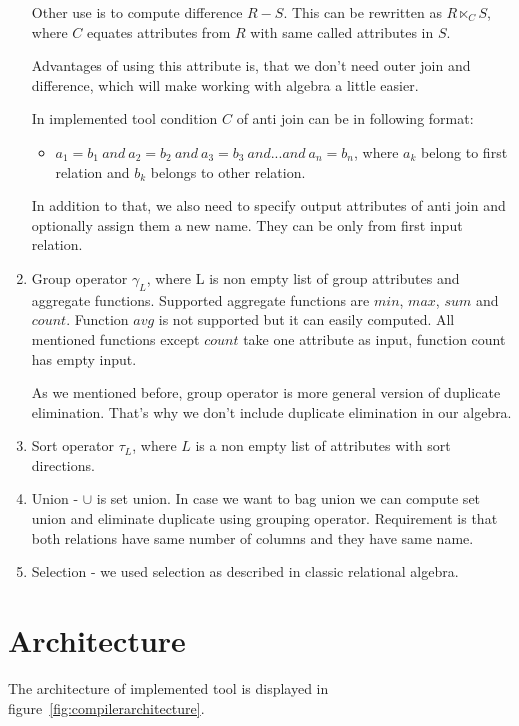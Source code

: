 \begin{enumerate}
Other use is to compute difference $R-S$. This can be rewritten as $R \ltimes_C S$, where $C$ equates attributes from $R$ with same called attributes in $S$. 
 
Advantages of using this attribute is, that we don't need outer join and difference, which will make working with algebra a little easier.

In implemented tool condition $C$ of anti join can be in following format:
\begin{itemize}
\item $a_1=b_1~and~a_2=b_2~and~a_3=b_3~and...and~a_n=b_n$, where $a_k$ belong to first relation and $b_k$ belongs to other relation.
\end{itemize}
In addition to that, we also need to specify output attributes of anti join and optionally assign them a new name. They can be only from first input relation.
\item Group operator $\gamma_L$, where L is non empty list of group attributes and aggregate functions. Supported aggregate functions are $min$, $max$, $sum$ and $count$. Function $avg$ is not supported but it can easily computed. All mentioned functions except $count$ take one attribute as input, function count has empty input. 

As we mentioned before, group operator is more general version of duplicate elimination. That's why we don't include duplicate elimination in our algebra.
\item Sort operator $\tau_L$, where $L$ is a non empty list of attributes with sort directions.
\item Union - $\cup$ is set union. In case we want to bag union we can compute set union and eliminate duplicate using grouping operator. Requirement is that both relations have same number of columns and they have same name.
\item Selection - we used selection as described in classic relational algebra.

\end{enumerate}


\section{Architecture}
The architecture of implemented tool is displayed in figure~\ref{fig:compilerarchitecture}.

